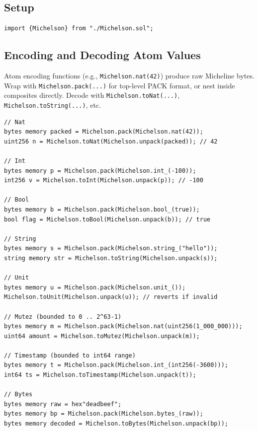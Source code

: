 \documentclass[11pt,a4paper]{article}
\begin{document}
\subsection{Setup}

\begin{codebox}[Import]
\begin{lstlisting}[language=Solidity]
import {Michelson} from "./Michelson.sol";
\end{lstlisting}
\end{codebox}

\subsection{Encoding and Decoding Atom Values}

Atom encoding functions (e.g., \texttt{Michelson.nat(42)}) produce raw Micheline
bytes. Wrap with \texttt{Michelson.pack(...)} for top-level PACK format, or nest
inside composites directly. Decode with \texttt{Michelson.toNat(...)},
\texttt{Michelson.toString(...)}, etc.

\begin{codebox}
\begin{lstlisting}[language=Solidity]
// Nat
bytes memory packed = Michelson.pack(Michelson.nat(42));
uint256 n = Michelson.toNat(Michelson.unpack(packed)); // 42

// Int
bytes memory p = Michelson.pack(Michelson.int_(-100));
int256 v = Michelson.toInt(Michelson.unpack(p)); // -100

// Bool
bytes memory b = Michelson.pack(Michelson.bool_(true));
bool flag = Michelson.toBool(Michelson.unpack(b)); // true

// String
bytes memory s = Michelson.pack(Michelson.string_("hello"));
string memory str = Michelson.toString(Michelson.unpack(s));

// Unit
bytes memory u = Michelson.pack(Michelson.unit_());
Michelson.toUnit(Michelson.unpack(u)); // reverts if invalid

// Mutez (bounded to 0 .. 2^63-1)
bytes memory m = Michelson.pack(Michelson.nat(uint256(1_000_000)));
uint64 amount = Michelson.toMutez(Michelson.unpack(m));

// Timestamp (bounded to int64 range)
bytes memory t = Michelson.pack(Michelson.int_(int256(-3600)));
int64 ts = Michelson.toTimestamp(Michelson.unpack(t));

// Bytes
bytes memory raw = hex"deadbeef";
bytes memory bp = Michelson.pack(Michelson.bytes_(raw));
bytes memory decoded = Michelson.toBytes(Michelson.unpack(bp));
\end{lstlisting}
\end{codebox}
\end{document}
